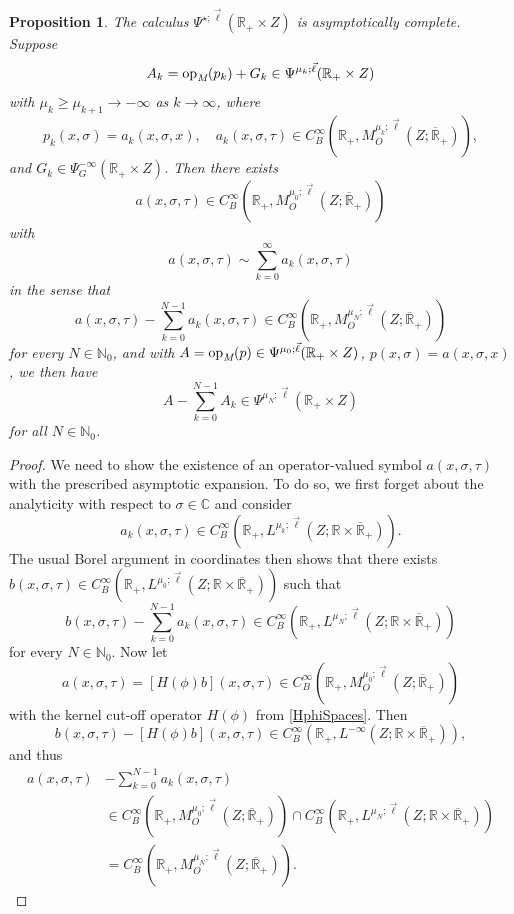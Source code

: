 \documentclass[reqno]{amsart}
\numberwithin{equation}{section}
\newtheorem{proposition}[equation]{Proposition}
\theoremstyle{definition}
\def\C{\mathbb C}
\def\N{\mathbb N}
\def\R{\mathbb R}
\def\opm{\textup{op}_{\textit{M}}}
\begin{document}
\begin{proposition}\label{AsymptoticComplete}
The calculus $\Psi^{\star;\vec{\ell}}(\R_+\times Z)$ is asymptotically complete. Suppose
$$
A_k = \opm(p_k) + G_k \in \Psi^{\mu_k;\vec{\ell}}(\R_+\times Z)
$$
with $\mu_k \geq \mu_{k+1} \to -\infty$ as $k \to \infty$, where
$$
p_k(x,\sigma) = a_k(x,\sigma,x), \quad a_k(x,\sigma,\tau) \in C^{\infty}_B(\R_+,M^{\mu_k;\vec{\ell}}_O(Z;\overline{\R}_+)),
$$
and $G_k \in \Psi^{-\infty}_G(\R_+\times Z)$. Then there exists
$$
a(x,\sigma,\tau) \in C^{\infty}_B(\R_+,M^{\mu_0;\vec{\ell}}_O(Z;\overline{\R}_+))
$$
with
$$
a(x,\sigma,\tau) \sim \sum\limits_{k=0}^{\infty}a_k(x,\sigma,\tau)
$$
in the sense that
$$
a(x,\sigma,\tau) - \sum\limits_{k=0}^{N-1}a_k(x,\sigma,\tau) \in C^{\infty}_B(\R_+,M^{\mu_N;\vec{\ell}}_O(Z;\overline{\R}_+))
$$
for every $N \in \N_0$, and with $A = \opm(p) \in \Psi^{\mu_0;\vec{\ell}}(\R_+\times Z)$, $p(x,\sigma) = a(x,\sigma,x)$, we then have
$$
A - \sum\limits_{k=0}^{N-1}A_k \in \Psi^{\mu_N;\vec{\ell}}(\R_+\times Z)
$$
for all $N \in \N_0$.
\end{proposition}
\begin{proof}
We need to show the existence of an operator-valued symbol $a(x,\sigma,\tau)$ with the prescribed asymptotic expansion. To do so, we first forget about the analyticity with respect to $\sigma \in \C$ and consider
$$
a_k(x,\sigma,\tau) \in C^{\infty}_B(\R_+,L^{\mu_k;\vec{\ell}}(Z;\R\times\overline{\R}_+)).
$$
The usual Borel argument in coordinates then shows that there exists $b(x,\sigma,\tau) \in C^{\infty}_B(\R_+,L^{\mu_0;\vec{\ell}}(Z;\R\times\overline{\R}_+))$ such that
$$
b(x,\sigma,\tau) - \sum\limits_{k=0}^{N-1}a_k(x,\sigma,\tau) \in C^{\infty}_B(\R_+,L^{\mu_N;\vec{\ell}}(Z;\R\times\overline{\R}_+))
$$
for every $N \in \N_0$. Now let
$$
a(x,\sigma,\tau) = [H(\phi)b](x,\sigma,\tau) \in C^{\infty}_B(\R_+,M^{\mu_0;\vec{\ell}}_O(Z;\overline{\R}_+))
$$
with the kernel cut-off operator $H(\phi)$ from \eqref{HphiSpaces}. Then
$$
b(x,\sigma,\tau) - [H(\phi)b](x,\sigma,\tau) \in C^{\infty}_B(\R_+,L^{-\infty}(Z;\R\times\overline{\R}_+)),
$$
and thus
\begin{align*}
a(x,\sigma,\tau) &- \sum\limits_{k=0}^{N-1}a_k(x,\sigma,\tau) \\
&\in C^{\infty}_B(\R_+,M^{\mu_0;\vec{\ell}}_O(Z;\overline{\R}_+))\cap C^{\infty}_B(\R_+,L^{\mu_N;\vec{\ell}}(Z;\R\times\overline{\R}_+)) \\
&= C^{\infty}_B(\R_+,M^{\mu_N;\vec{\ell}}_O(Z;\overline{\R}_+)).
\end{align*}
\end{proof}
\end{document}
